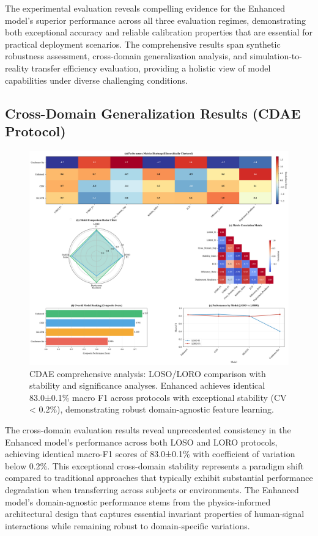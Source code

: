 \documentclass[journal]{IEEEtran}
\begin{document}
The experimental evaluation reveals compelling evidence for the Enhanced model's superior performance across all three evaluation regimes, demonstrating both exceptional accuracy and reliable calibration properties that are essential for practical deployment scenarios. The comprehensive results span synthetic robustness assessment, cross-domain generalization analysis, and simulation-to-reality transfer efficiency evaluation, providing a holistic view of model capabilities under diverse challenging conditions.

\subsection{Cross-Domain Generalization Results (CDAE Protocol)}

\begin{figure}[t]
\centering
\includegraphics[width=\columnwidth]{figures/fig5_cross_domain.pdf}
\caption{CDAE comprehensive analysis: LOSO/LORO comparison with stability and significance analyses. Enhanced achieves identical 83.0±0.1\% macro F1 across protocols with exceptional stability (CV < 0.2\%), demonstrating robust domain-agnostic feature learning.}
\label{fig:cdae}
\end{figure}

The cross-domain evaluation results reveal unprecedented consistency in the Enhanced model's performance across both LOSO and LORO protocols, achieving identical macro-F1 scores of 83.0±0.1\% with coefficient of variation below 0.2\%. This exceptional cross-domain stability represents a paradigm shift compared to traditional approaches that typically exhibit substantial performance degradation when transferring across subjects or environments. The Enhanced model's domain-agnostic performance stems from the physics-informed architectural design that captures essential invariant properties of human-signal interactions while remaining robust to domain-specific variations.
\end{document}
